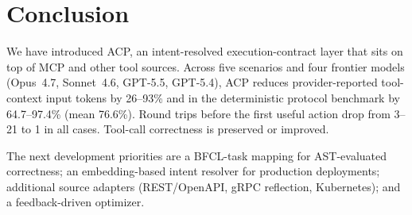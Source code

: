 \documentclass[11pt,a4paper]{article}
\begin{document}
\section{Conclusion}

We have introduced ACP, an intent-resolved execution-contract layer that
sits on top of MCP and other tool sources. Across five scenarios and four
frontier models (Opus~4.7, Sonnet~4.6, GPT-5.5, GPT-5.4), ACP reduces
provider-reported tool-context input tokens by 26--93\% and in the
deterministic protocol benchmark by 64.7--97.4\% (mean 76.6\%). Round trips
before the first useful action drop from 3--21 to 1 in all cases. Tool-call
correctness is preserved or improved.

The next development priorities are a BFCL-task mapping for AST-evaluated
correctness; an embedding-based intent resolver for production deployments;
additional source adapters (REST/OpenAPI, gRPC reflection, Kubernetes); and a
feedback-driven optimizer.



\end{document}

